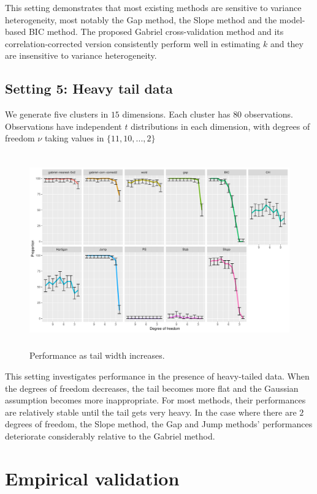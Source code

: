 \documentclass[12pt]{article}
\begin{document}
This setting demonstrates that most existing methods are sensitive to variance
heterogeneity, most notably the Gap method, the Slope method and the model-based BIC method. The
proposed Gabriel cross-validation method and its correlation-corrected version
consistently perform well in estimating $k$ and they are insensitive to
variance heterogeneity.
	

\subsection{Setting 5: Heavy tail data}

We generate five clusters in $15$ dimensions. Each cluster has $80$
observations.  Observations have independent $t$ distributions in each
dimension, with degrees of freedom $\nu$ taking values in $\{11,10,...,2\}$
     
\begin{figure}[H]
\centering
\includegraphics[width=5.5in, height=3.3in]{main_code/demo/bench/setting5/Facet.pdf}
\caption{Performance as tail width increases.}
\label{fig:setting5}
\end{figure}

This setting investigates performance in the presence of heavy-tailed data.
When the degrees of freedom decreases, the tail becomes more flat and the
Gaussian assumption becomes more inappropriate.  For most methods, their
performances are relatively stable until the tail gets very heavy. In the case
where there are $2$ degrees of freedom, the Slope method, the Gap and Jump methods' performances
deteriorate considerably relative to the Gabriel method.


\section{Empirical validation}
\label{sec:empirical-validation}
\end{document}
